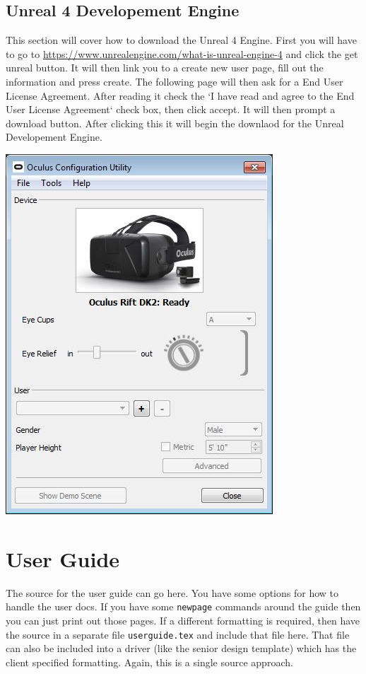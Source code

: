 \subsection{Unreal 4 Developement Engine}
This section will cover how to download the Unreal 4 Engine. First you will have to go to \url{https://www.unrealengine.com/what-is-unreal-engine-4} and click the get unreal button. It will then link you to  a create new user page, fill out the information and press create. The following page will then ask for a End User License Agreement. After reading it check the `I have read and agree to the End User License Agreement` check box, then click accept. It will then prompt a download button. After clicking this it will begin the downlaod for the Unreal Developement Engine.

\begin{center}
\centering
\includegraphics[scale=0.75]{Oculus_Config_Utility}\\
\end{center}


\section{User Guide}

The source for the user guide can go here.    You have some options for how to handle the user docs.  If you have some {\tt newpage} commands around the guide then you can just print out those pages.   If a different formatting is required, then have the source in a separate file {\tt userguide.tex} and include that file here.  That file can also be included into a driver (like the senior design template) which has the client specified formatting.  Again, this is a single source approach.   

